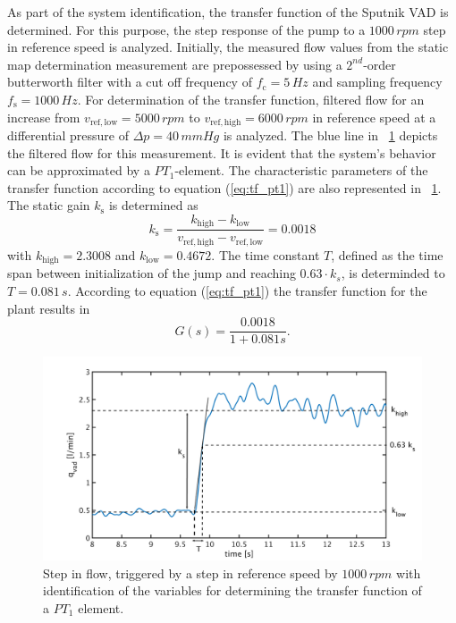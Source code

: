 As part of the system identification, the transfer function of the Sputnik VAD is determined. For this purpose, the step response of the pump to a $1000\,rpm$ step in reference speed is analyzed.
\newpage
Initially, the measured flow values from the static map determination measurement are prepossessed by using a $2^{nd}$-order butterworth filter with a cut off frequency of $f_{\mathrm{c}} = 5\,Hz$ and sampling frequency $f_{\mathrm{s}}=1000 \, Hz$. For determination of the transfer function, filtered flow for an increase from $v_{\mathrm{ref,low}}=5000\,rpm$ to $v_{\mathrm{ref,high}}=6000\,rpm$ in reference speed at a differential pressure of $\Delta{p}=40\,mmHg$ is analyzed. The blue line in \figurename~\ref{fig:plant} depicts the filtered flow for this measurement. It is evident that the system's behavior can be approximated by a $PT_1$-element.
The characteristic parameters of the transfer function according to equation (\ref{eq:tf_pt1}) are also represented in \figurename~\ref{fig:plant}. The static gain $k_{\mathrm{s}}$ is determined as
\begin{equation}
  k_{\mathrm{s}} = \frac{k_{\mathrm{high}}-k_{\mathrm{low}}}{v_{\mathrm{ref,high}}-v_{\mathrm{ref,low}}}=0.0018
\label{eq:k_s_1}
\end{equation}
with $k_{\mathrm{high}}=2.3008$ and $k_{\mathrm{low}}=0.4672$. The time constant $T$, defined as the time span between initialization of the jump and reaching $0.63 \cdot k_s$, is determinded to $T=0.081\,s$.
According to equation (\ref{eq:tf_pt1}) the transfer function for the plant results in
\begin{equation}
    G(s) = \frac{0.0018}{1+0.081s}.
 \label{eq:plant}
\end{equation}
\begin{figure}[ht!]
  \centering
  \includegraphics[width=\textwidth]{images/chapt_4/plant_generation.pdf}
  \caption[Transfer function of Sputnik VAD]{Step in flow, triggered by a step in reference speed by $1000\,rpm$ with identification of the variables for determining the transfer function of a $PT_{\mathrm{1}}$ element.}
  \label{fig:plant}
\end{figure}
